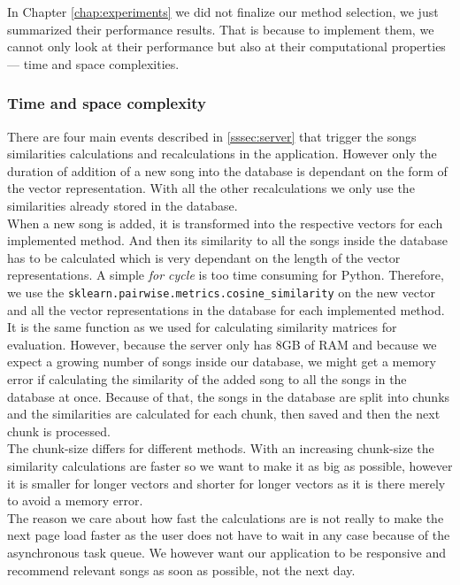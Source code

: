 In Chapter \ref{chap:experiments} we did not finalize our method selection, we just summarized their performance results. That is because to implement them, we cannot only look at their performance but also at their computational properties --- time and space complexities. \\

\subsubsection{Time and space complexity}

There are four main events described in \ref{sssec:server} that trigger the songs similarities calculations and recalculations in the application. However only the duration of addition of a new song into the database is dependant on the form of the vector representation. With all the other recalculations we only use the similarities already stored in the database. \\

When a new song is added, it is transformed into the respective vectors for each implemented method. And then its similarity to all the songs inside the database has to be calculated which is very dependant on the length of the vector representations. A simple \textit{for cycle} is too time consuming for Python. Therefore, we use the \texttt{sklearn.pairwise.metrics.cosine\_similarity} on the new vector and all the vector representations in the database for each implemented method. It is the same function as we used for calculating similarity matrices for evaluation. However, because the server only has 8GB of RAM and because we expect a growing number of songs inside our database, we might get a memory error if calculating the similarity of the added song to all the songs in the database at once. Because of that, the songs in the database are split into chunks and the similarities are calculated for each chunk, then saved and then the next chunk is processed. \\
The chunk-size differs for different methods. With an increasing chunk-size the similarity calculations are faster so we want to make it as big as possible, however it is smaller for longer vectors and shorter for longer vectors as it is there merely to avoid a memory error. \\
The reason we care about how fast the calculations are is not really to make the next page load faster as the user does not have to wait in any case because of the asynchronous task queue. We however want our application to be responsive and recommend relevant songs as soon as possible, not the next day. \\

